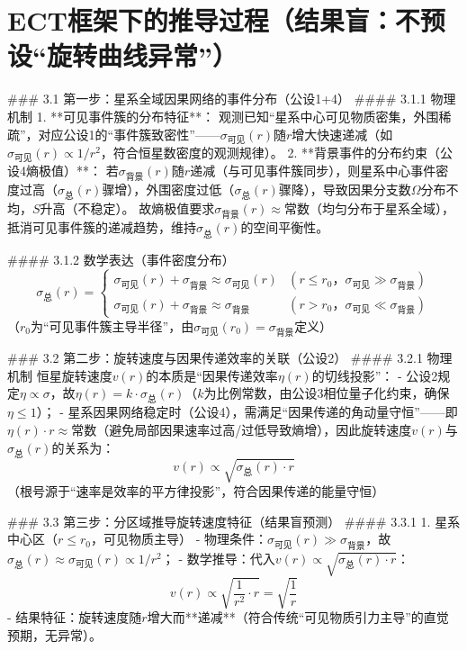 \documentclass{article}
\begin{document}
\section{ECT框架下的推导过程（结果盲：不预设“旋转曲线异常”）}
### 3.1 第一步：星系全域因果网络的事件分布（公设1+4）
#### 3.1.1 物理机制
1. **可见事件簇的分布特征**：  
   观测已知“星系中心可见物质密集，外围稀疏”，对应公设1的“事件簇致密性”——\(\sigma_{\text{可见}}(r)\)随\(r\)增大快速递减（如\(\sigma_{\text{可见}}(r) \propto 1/r^2\)，符合恒星数密度的观测规律）。
2. **背景事件的分布约束（公设4熵极值）**：  
   若\(\sigma_{\text{背景}}(r)\)随\(r\)递减（与可见事件簇同步），则星系中心事件密度过高（\(\sigma_{\text{总}}(r)\)骤增），外围密度过低（\(\sigma_{\text{总}}(r)\)骤降），导致因果分支数\(\Omega\)分布不均，\(S\)升高（不稳定）。  
   故熵极值要求\(\sigma_{\text{背景}}(r) \approx \text{常数}\)（均匀分布于星系全域），抵消可见事件簇的递减趋势，维持\(\sigma_{\text{总}}(r)\)的空间平衡性。

#### 3.1.2 数学表达（事件密度分布）
\[
\sigma_{\text{总}}(r) = 
\begin{cases} 
\sigma_{\text{可见}}(r) + \sigma_{\text{背景}} \approx \sigma_{\text{可见}}(r) & (r \leq r_0，\sigma_{\text{可见}} \gg \sigma_{\text{背景}}) \\
\sigma_{\text{可见}}(r) + \sigma_{\text{背景}} \approx \sigma_{\text{背景}} & (r > r_0，\sigma_{\text{可见}} \ll \sigma_{\text{背景}})
\end{cases}
\]
（\(r_0\)为“可见事件簇主导半径”，由\(\sigma_{\text{可见}}(r_0) = \sigma_{\text{背景}}\)定义）


### 3.2 第二步：旋转速度与因果传递效率的关联（公设2）
#### 3.2.1 物理机制
恒星旋转速度\(v(r)\)的本质是“因果传递效率\(\eta(r)\)的切线投影”：  
- 公设2规定\(\eta \propto \sigma\)，故\(\eta(r) = k \cdot \sigma_{\text{总}}(r)\)（\(k\)为比例常数，由公设3相位量子化约束，确保\(\eta \leq 1\)）；  
- 星系因果网络稳定时（公设4），需满足“因果传递的角动量守恒”——即\(\eta(r) \cdot r \approx \text{常数}\)（避免局部因果速率过高/过低导致熵增），因此旋转速度\(v(r)\)与\(\sigma_{\text{总}}(r)\)的关系为：  
  \[
  v(r) \propto \sqrt{\sigma_{\text{总}}(r) \cdot r}
  \]
（根号源于“速率是效率的平方律投影”，符合因果传递的能量守恒）


### 3.3 第三步：分区域推导旋转速度特征（结果盲预测）
#### 3.3.1 1. 星系中心区（\(r \leq r_0\)，可见物质主导）
- 物理条件：\(\sigma_{\text{可见}}(r) \gg \sigma_{\text{背景}}\)，故\(\sigma_{\text{总}}(r) \approx \sigma_{\text{可见}}(r) \propto 1/r^2\)；
- 数学推导：代入\(v(r) \propto \sqrt{\sigma_{\text{总}}(r) \cdot r}\)：  
  \[
  v(r) \propto \sqrt{\frac{1}{r^2} \cdot r} = \sqrt{\frac{1}{r}}
  \]
- 结果特征：旋转速度随\(r\)增大而**递减**（符合传统“可见物质引力主导”的直觉预期，无异常）。
\end{document}
